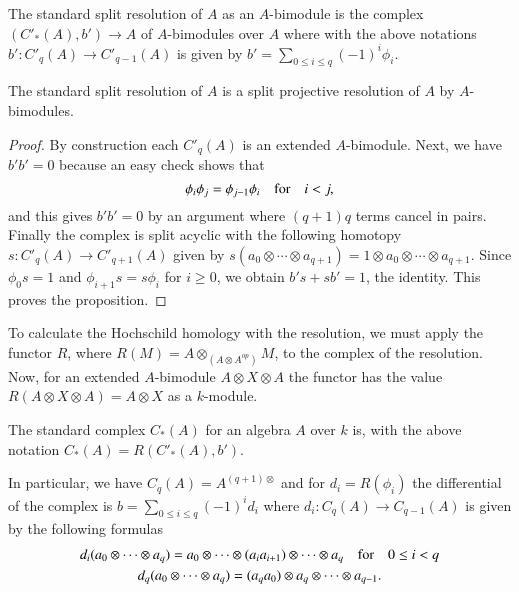 \begin{definition}\label{chap3-defi1.1}
The standard split resolution of $A$ as an $A$-bimodule is the complex
$(C'_{\ast}(A),b')\to A$ of $A$-bimodules over $A$ where with the
above notations $b':C'_{q}(A)\to C'_{q-1}(A)$ is given by
$b'=\sum\limits_{0\leq i\leq q}(-1)^{i}\phi_{i}$.
\end{definition}

\begin{proposition}\label{chap3-prop1.2}
The standard split resolution of $A$ is a split projective resolution
of $A$ by $A$-bimodules.
\end{proposition}

\begin{proof}
By construction each $C'_{q}(A)$ is an extended $A$-bimodule. Next, we
have $b'b'=0$ because an easy check shows that
$$
\phi_{i}\phi_{j}=\phi_{j-1}\phi_{i}\quad\text{for}\quad i<j,
$$
and this gives $b'b'=0$ by an argument where $(q+1)q$ terms cancel in
pairs. Finally the complex is split acyclic with the following
homotopy $s:C'_{q}(A)\to C'_{q+1}(A)$ given by
$s(a_{0}\otimes\cdots\otimes a_{q+1})=1\otimes
a_{0}\otimes\cdots\otimes a_{q+1}$. Since $\phi_{0}s=1$ and
$\phi_{i+1}s=s\phi_{i}$ for $i\geq 0$, we obtain $b's+sb'=1$, the
identity. This proves the proposition.
\end{proof}

To calculate the Hochschild homology with the resolution, we must
apply the functor $R$, where $R(M)=A\otimes_{(A\otimes A^{op})}M$, to
the complex of the resolution. Now, for an extended $A$-bimodule
$A\otimes X\otimes A$ the functor has the value $R(A\otimes X\otimes
A)=A\otimes X$ as a $k$-module.

\begin{definition}\label{chap3-defi1.3}
The standard complex $C_{\ast}(A)$ for an algebra $A$ over $k$ is,
with the above notation $C_{\ast}(A)=R(C'_{\ast}(A),b')$.
\end{definition}

In particular, we have $C_{q}(A)=A^{(q+1)\otimes}$ and for
$d_{i}=R(\phi_{i})$ the differential of the complex is
$b=\sum\limits_{0\leq i\leq q}(-1)^{i}d_{i}$ where $d_{i}:C_{q}(A)\to
C_{q-1}(A)$ is given by the following formulas
\begin{gather*}
d_{i}(a_{0}\otimes\cdots\otimes
a_{q})=a_{0}\otimes\cdots\otimes(a_{i}a_{i+1})\otimes \cdots\otimes
a_{q}\quad\text{for}\quad 0\leq i<q\\
d_{q}(a_{0}\otimes\cdots\otimes a_{q})=(a_{q}a_{0})\otimes
a_{q}\otimes\cdots\otimes a_{q-1}. 
\end{gather*}\pageoriginale

